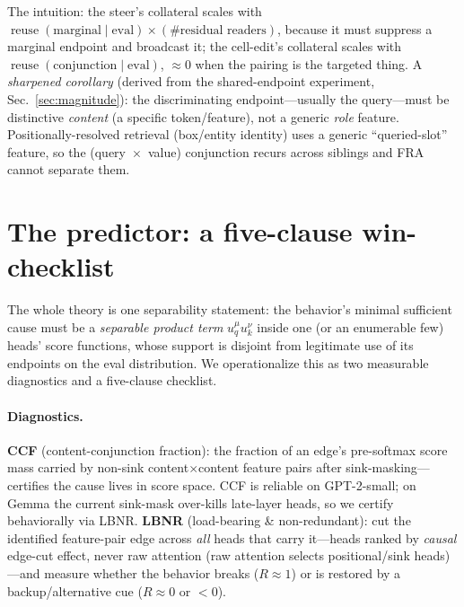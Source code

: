 \documentclass[11pt]{article}
\newcommand{\reuse}{\operatorname{reuse}}
\theoremstyle{definition}
\theoremstyle{plain}
\theoremstyle{remark}
\begin{document}
The intuition: the steer's collateral scales with $\reuse(\text{marginal}\mid\text{eval})\times(\#\text{residual readers})$, because it must suppress a marginal endpoint and broadcast it; the cell-edit's collateral scales with $\reuse(\text{conjunction}\mid\text{eval})$, $\approx 0$ when the pairing is the targeted thing. A \emph{sharpened corollary} (derived from the shared-endpoint experiment, Sec.~\ref{sec:magnitude}): the discriminating endpoint---usually the query---must be distinctive \emph{content} (a specific token/feature), not a generic \emph{role} feature. Positionally-resolved retrieval (box/entity identity) uses a generic ``queried-slot'' feature, so the (query~$\times$~value) conjunction recurs across siblings and FRA cannot separate them.

\section{The predictor: a five-clause win-checklist}\label{sec:checklist}

The whole theory is one separability statement: the behavior's minimal sufficient cause must be a \emph{separable product term} $u^\mu_q u^\nu_k$ inside one (or an enumerable few) heads' score functions, whose support is disjoint from legitimate use of its endpoints on the eval distribution. We operationalize this as two measurable diagnostics and a five-clause checklist.

\paragraph{Diagnostics.} \textbf{CCF} (content-conjunction fraction): the fraction of an edge's pre-softmax score mass carried by non-sink content$\times$content feature pairs after sink-masking---certifies the cause lives in score space. CCF is reliable on GPT-2-small; on Gemma the current sink-mask over-kills late-layer heads, so we certify behaviorally via LBNR. \textbf{LBNR} (load-bearing \& non-redundant): cut the identified feature-pair edge across \emph{all} heads that carry it---heads ranked by \emph{causal} edge-cut effect, never raw attention (raw attention selects positional/sink heads)---and measure whether the behavior breaks ($R\approx 1$) or is restored by a backup/alternative cue ($R\approx 0$ or $<0$).
\end{document}
